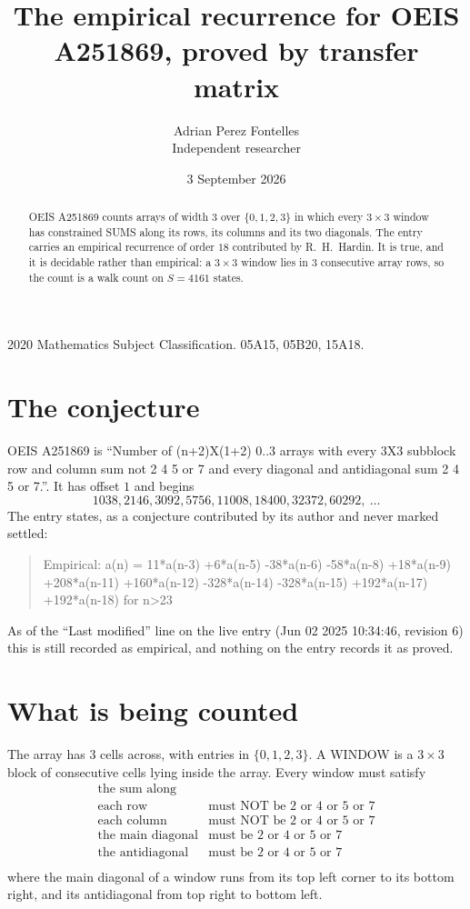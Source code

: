 \documentclass[11pt,a4paper]{article}
\title{The empirical recurrence for OEIS A251869, proved by transfer matrix}
\author{Adrian Perez Fontelles\\ \small Independent researcher}
\date{3 September 2026}
\theoremstyle{plain}
\theoremstyle{definition}
\begin{document}
\maketitle

\begin{abstract}
OEIS A251869 counts arrays of width $3$ over $\{0,1,2,3\}$ in which every $3\times3$ window has
constrained SUMS along its rows, its columns and its two diagonals. The entry carries an
empirical recurrence of order $18$ contributed by R.~H.~Hardin. It is true, and it is
decidable rather than empirical: a $3\times3$ window lies in $3$ consecutive array rows,
so the count is a walk count on $S=4161$ states.
\end{abstract}

\noindent\small 2020 Mathematics Subject Classification. 05A15, 05B20, 15A18.\normalsize

\section{The conjecture}

OEIS A251869 is ``Number of (n+2)X(1+2) 0..3 arrays with every 3X3 subblock row and column sum not 2 4 5 or 7 and every diagonal and antidiagonal sum 2 4 5 or 7.''. It has offset $1$ and begins
\[
1038, 2146, 3092, 5756, 11008, 18400, 32372, 60292,\ \dots
\]
The entry states, as a conjecture contributed by its author and never marked settled:
\begin{quote}
Empirical: a(n) = 11*a(n-3) +6*a(n-5) -38*a(n-6) -58*a(n-8) +18*a(n-9) +208*a(n-11) +160*a(n-12) -328*a(n-14) -328*a(n-15) +192*a(n-17) +192*a(n-18) for n>23
\end{quote}
As of the ``Last modified'' line on the live entry (Jun 02 2025 10:34:46, revision 6) this is still
recorded as empirical, and nothing on the entry records it as proved.

\section{What is being counted}

The array has $3$ cells across, with entries in $\{0,1,2,3\}$. A WINDOW is a $3\times3$ block
of consecutive cells lying inside the array. Every window must satisfy
\[
\begin{array}{ll}
\text{the sum along} & \text{} \\[2pt]
\text{each row} & \text{must NOT be 2 or 4 or 5 or 7} \\
\text{each column} & \text{must NOT be 2 or 4 or 5 or 7} \\
\text{the main diagonal} & \text{must be 2 or 4 or 5 or 7} \\
\text{the antidiagonal} & \text{must be 2 or 4 or 5 or 7} \\
\end{array}
\]
where the main diagonal of a window runs from its top left corner to its bottom right, and its
antidiagonal from top right to bottom left.
\end{document}
